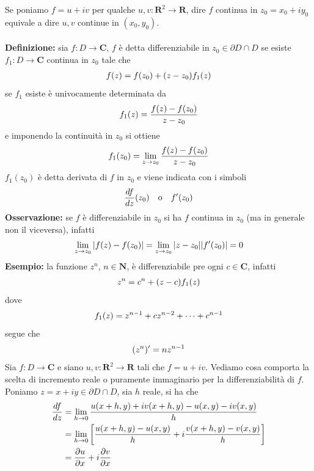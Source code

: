 \documentclass{article}
\begin{document}
Se poniamo $f = u + iv$ per qualche $u, v : \mathbf{R}^2 \longrightarrow \mathbf{R}$, dire $f$ continua in $z_0 = x_0 + iy_0$ equivale a dire $u, v$ continue in $(x_0, y_0)$. \\ \\
\textbf{Definizione:} sia $f : D \longrightarrow \mathbf{C}$, $f$ è detta differenziabile in $z_0 \in \partial D \cap D$ se esiste $f_1 : D \longrightarrow \mathbf{C}$ continua in $z_0$ tale che
\begin{gather}
    f(z) = f(z_0) + (z - z_0)f_1(z) \notag
\end{gather}
se $f_1$ esiste è univocamente determinata da
\begin{gather}
    f_1(z) = \frac{f(z) - f(z_0)}{z - z_0} \notag
\end{gather}
e imponendo la continuità in $z_0$ si ottiene
\begin{gather}
    f_1(z_0) = \lim_{z \rightarrow z_0}\frac{f(z) - f(z_0)}{z - z_0} \notag
\end{gather}
$f_1(z_0)$ è detta derivata di $f$ in $z_0$ e viene indicata con i simboli
\begin{gather}
    \frac{df}{dz}(z_0) \quad \text{o} \quad f'(z_0) \notag
\end{gather}
\textbf{Osservazione:} se $f$ è differenziabile in $z_0$ si ha $f$ continua in $z_0$ (ma in generale non il viceversa), infatti
\begin{gather}
    \lim_{z \rightarrow z_0}|f(z) - f(z_0)| = \lim_{z \rightarrow z_0}|z - z_0||f'(z_0)| = 0 \notag
\end{gather}
\textbf{Esempio:} la funzione $z^n$, $n \in \mathbf{N}$, è differenziabile pre ogni $c \in \mathbf{C}$, infatti
\begin{gather}
    z^n = c^n + (z - c)f_1(z) \notag
\end{gather}
dove
\begin{gather}
    f_1(z) = z^{n - 1} + cz^{n - 2} + \dots + c^{n - 1} \notag
\end{gather}
segue che
\begin{gather}
    (z^n)' = nz^{n - 1} \notag
\end{gather}
Sia $f : D \longrightarrow \mathbf{C}$ e siano $u, v : \mathbf{R}^2 \longrightarrow \mathbf{R}$ tali che $f = u + iv$. Vediamo cosa comporta la scelta di incremento reale o puramente immaginario per la differenziabilità di $f$. Poniamo $z = x + iy \in \partial D \cap D$, sia $h$ reale, si ha che
\begin{align}
    \frac{df}{dz} &= \lim_{h \rightarrow 0}\frac{u(x + h, y) + iv(x + h, y) - u(x, y) -iv(x, y)}{h} \notag \\
    &= \lim_{h \rightarrow 0}\left[\frac{u(x + h, y) - u(x, y)}{h} + i\frac{v(x + h, y) - v(x, y)}{h}\right] \notag \\
    &= \frac{\partial u}{\partial x} + i\frac{\partial v}{\partial x} \notag
\end{align}
\end{document}
